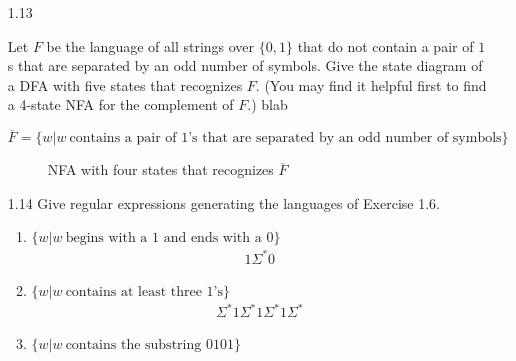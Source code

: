 \begin{enumerate}

    \item [1.13]
          
          Let $F$ be the language of all strings over $\{0,1\}$ that do not contain a pair of $1$s that are separated by an odd number of symbols. Give the state diagram of a DFA with five states that recognizes $F$. (You may find it helpful first to find a 4-state NFA for the complement of $F$.) blab 
          
          $\overline{F} = \{w|w~ \text{contains a pair of }1\text{'s that are separated by an odd number of symbols}\}$
          
          \begin{figure}[H]
              \centering
              \caption{NFA with four states that recognizes $\overline{F}$}
          \end{figure}
    \item [1.14]
          Give regular expressions generating the languages of Exercise 1.6.
          \begin{enumerate}
              \item $\{w|w~ \text{begins with a }1\text{ and ends with a }0\}$
                    \begin{align*}
                        1\Sigma^*0
                    \end{align*}
              \item $\{w|w~ \text{contains at least three }1\text{'s}\}$
                    \begin{align*}
                        \Sigma^*1\Sigma^*1\Sigma^*1\Sigma^*
                    \end{align*}
              \item $\{w|w~ \text{contains the substring }0101\}$
                    \begin{align*}

\end{align*}
\end{enumerate}
\end{enumerate}
